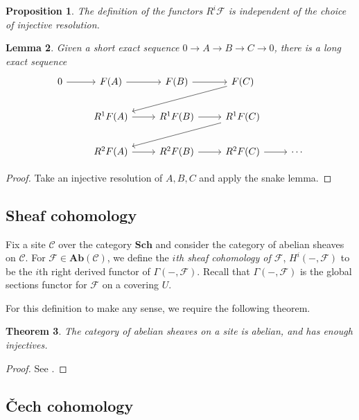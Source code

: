 \documentclass{amsart}
\newcommand{\Sch}{\mathbf{Sch}}
\newcommand{\Ab}{\mathbf{Ab}}
\newtheorem{theorem}{Theorem}[section]
\newtheorem{proposition}[theorem]{Proposition}
\newtheorem{lemma}[theorem]{Lemma}
\theoremstyle{definition}
\theoremstyle{remark}
\begin{document}
\begin{proposition}
    The definition of the functors $R^i \mathcal{F}$ is independent of the
    choice of injective resolution.
\end{proposition}

\begin{lemma}
    Given a short exact sequence $0 \to A \to B \to C \to 0$, there is a long
    exact sequence
    \[
        \begin{tikzcd}
            0 \ar[r] &
            F(A) \ar[r] &
            F(B) \ar[r] &
            F(C) \ar[dll] \\
            &
            R^1F(A) \ar[r] &
            R^1F(B) \ar[r] &
            R^1F(C) \ar[dll] \\
            &
            R^2F(A) \ar[r] &
            R^2F(B) \ar[r] &
            R^2F(C) \ar[r] & \cdots
        \end{tikzcd}
    \]
\end{lemma}

\begin{proof}
    Take an injective resolution of $A, B, C$ and apply the snake lemma.
\end{proof}

\subsection{Sheaf cohomology}

Fix a site $\mathcal{C}$ over the category $\Sch$ and consider the category of
abelian sheaves on $\mathcal{C}$. For $\mathcal{F} \in \Ab(\mathcal{C})$, we
define the \textit{$i$th sheaf cohomology of $\mathcal{F}$}, $H^i({-},
\mathcal{F})$ to be the $i$th right derived functor of $\Gamma({-},
\mathcal{F})$. Recall that $\Gamma({-}, \mathcal{F})$ is the global sections
functor for $\mathcal{F}$ on a covering $U$.

For this definition to make any sense, we require the following theorem.

\begin{theorem}
    The category of abelian sheaves on a site is abelian, and has enough
    injectives.
\end{theorem}

\begin{proof}
    See \cite[\href{https://stacks.math.columbia.edu/tag/03NT}{Tag
        03NT}]{stacks-project}.
\end{proof}

\subsection{\v{C}ech cohomology}
\end{document}
